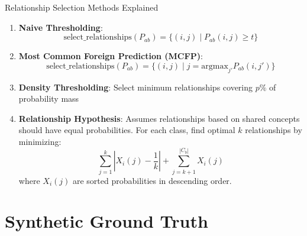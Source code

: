 \documentclass[aspectratio=169]{beamer}
\begin{document}
\begin{frame}{Relationship Selection Methods Explained}
    \begin{enumerate}
        \item \textbf{Naive Thresholding}:
              \begin{equation}
                  \text{select\_relationships}(P_{ab}) = \{(i, j) \mid P_{ab}(i, j) \geq t\}
              \end{equation}

        \item \textbf{Most Common Foreign Prediction (MCFP)}:
              \begin{equation}
                  \text{select\_relationships}(P_{ab}) = \{(i, j) \mid j = \text{argmax}_{j'} P_{ab}(i, j')\}
              \end{equation}

        \item \textbf{Density Thresholding}: Select minimum relationships covering $p\%$ of probability mass

        \item \textbf{Relationship Hypothesis}: Assumes relationships based on shared concepts should have equal probabilities. For each class, find optimal $k$ relationships by minimizing:
              \begin{equation}
                  \sum_{j=1}^k \left| X_i(j) - \frac{1}{k} \right| + \sum_{j=k+1}^{|C_b|} X_i(j)
              \end{equation}
              where $X_i(j)$ are sorted probabilities in descending order.
    \end{enumerate}
\end{frame}

\section{Synthetic Ground Truth}
\end{document}
